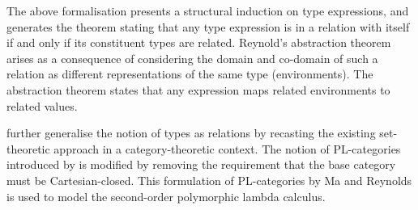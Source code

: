 \documentclass[../../Dissertation.tex]{subfiles}
\begin{document}
The above formalisation presents a structural induction on type expressions, and generates the theorem stating that any type expression is in a relation with itself if and only if its constituent types are related. Reynold's abstraction theorem arises as a consequence of considering the domain and co-domain of such a relation as different representations of the same type (environments). The abstraction theorem states that any expression maps related environments to related values.

 further generalise the notion of types as relations by recasting the existing set-theoretic approach in a category-theoretic context. The notion of PL-categories introduced by  is modified by removing the requirement that the base category must be Cartesian-closed. This formulation of PL-categories by Ma and Reynolds is used to model the second-order polymorphic lambda calculus.
\end{document}
